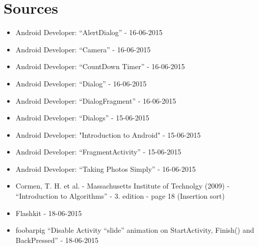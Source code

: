 \section{Sources}
\begin{itemize}
	\item Android Developer: “AlertDialog” - 16-06-2015 \\ 	
	\item Android Developer: “Camera” - 16-06-2015 \\
	\item Android Developer: “CountDown Timer” - 16-06-2015 \\ 
	\item Android Developer: “Dialog” - 16-06-2015 \\ 	
	\item Android Developer: “DialogFragment” - 16-06-2015 \\ 	
	\item Android Developer: “Dialogs” - 15-06-2015 \\ 	
	\item Android Developer: "Introduction to Android" - 15-06-2015 \\ 	
	\item Android Developer: “FragmentActivity” - 15-06-2015 \\ 
	\item Android Developer: “Taking Photos Simply” - 16-06-2015 \\ 
	\item Cormen, T. H. et al. - Massachusetts Institute of Technolgy (2009) - “Introduction to Algorithms” - 3. edition - page 18 (Insertion sort) 
	\item Flashkit - 18-06-2015 \\
	\item foobarpig “Disable Activity “slide” animation on StartActivity, Finish() and BackPressed” - 18-06-2015 \\

\end{itemize}

